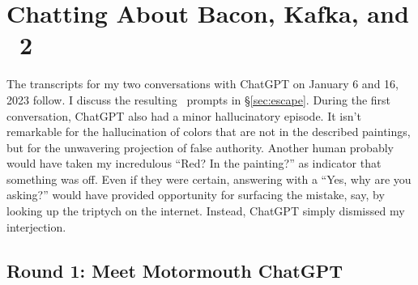 \section{Chatting About Bacon, Kafka, and \DDAALLEE\ 2}
\label{app:chatgpt}

The transcripts for my two conversations with ChatGPT on January 6 and 16,
2023 follow. I discuss the resulting \DALLE\ prompts in \S\ref{sec:escape}.
During the first conversation, ChatGPT also had a minor hallucinatory episode.
It isn't remarkable for the hallucination of colors that are not in the
described paintings, but for the unwavering projection of false authority.
Another human probably would have taken my incredulous ``Red? In the painting?''
as indicator that something was off. Even if they were certain, answering with a
``Yes, why are you asking?'' would have provided opportunity for surfacing the
mistake, say, by looking up the triptych on the internet. Instead, ChatGPT
simply dismissed my interjection.


\subsection{Round 1: Meet Motormouth ChatGPT}

